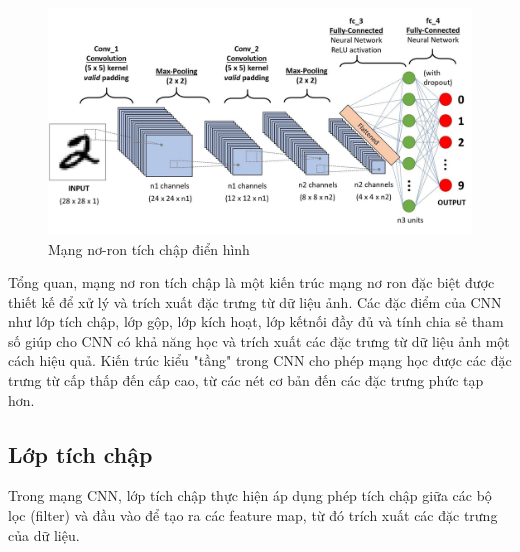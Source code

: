 \begin{figure}
	\centering
	\includegraphics[width=0.9\linewidth]{images/typical-cnn.png}
	\caption{Mạng nơ-ron tích chập điển hình\cite{Ratan_2023}}
	\label{fig:typical-cnn}
\end{figure}

Tổng quan, mạng nơ ron tích chập là một kiến trúc mạng nơ ron đặc biệt được thiết kế để xử lý và trích xuất đặc trưng từ dữ liệu ảnh. Các đặc điểm của CNN như lớp tích chập, lớp gộp, lớp kích hoạt, lớp kếtnối đầy đủ và tính chia sẻ tham số giúp cho CNN có khả năng học và trích xuất các đặc trưng từ dữ liệu ảnh một cách hiệu quả. Kiến trúc kiểu "tầng" trong CNN cho phép mạng học được các đặc trưng từ cấp thấp đến cấp cao, từ các nét cơ bản đến các đặc trưng phức tạp hơn.


\subsection{Lớp tích chập}
Trong mạng CNN, lớp tích chập thực hiện áp dụng phép tích chập giữa các bộ lọc (filter) và đầu vào để tạo ra các feature map, từ đó trích xuất các đặc trưng của dữ liệu.

